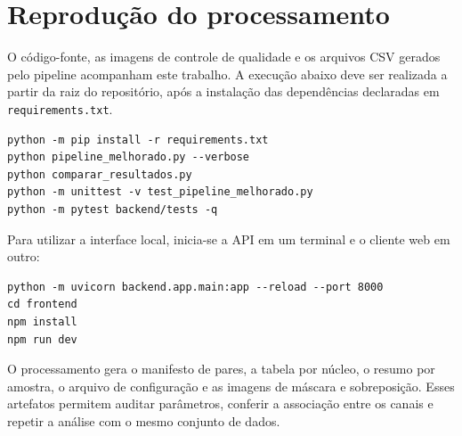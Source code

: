 \chapter{Reprodução do processamento}
\label{ap:reprodutibilidade}

O código-fonte, as imagens de controle de qualidade e os arquivos CSV gerados pelo pipeline acompanham este trabalho. A execução abaixo deve ser realizada a partir da raiz do repositório, após a instalação das dependências declaradas em \texttt{requirements.txt}.

\begin{verbatim}
python -m pip install -r requirements.txt
python pipeline_melhorado.py --verbose
python comparar_resultados.py
python -m unittest -v test_pipeline_melhorado.py
python -m pytest backend/tests -q
\end{verbatim}

Para utilizar a interface local, inicia-se a API em um terminal e o cliente web em outro:

\begin{verbatim}
python -m uvicorn backend.app.main:app --reload --port 8000
cd frontend
npm install
npm run dev
\end{verbatim}

O processamento gera o manifesto de pares, a tabela por núcleo, o resumo por amostra, o arquivo de configuração e as imagens de máscara e sobreposição. Esses artefatos permitem auditar parâmetros, conferir a associação entre os canais e repetir a análise com o mesmo conjunto de dados.
